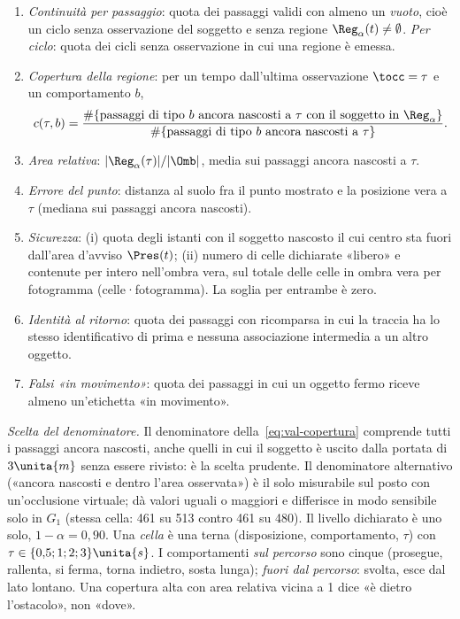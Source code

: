 \begin{definizione}[Misure]\label{def:val-misure}
\begin{enumerate}[label=(\alph*),itemsep=0pt]
\item \emph{Continuità per passaggio}: quota dei passaggi validi con almeno un \emph{vuoto}, cioè un ciclo senza osservazione del soggetto e senza regione $\Reg_\alpha(t)\neq\emptyset$. \emph{Per ciclo}: quota dei cicli senza osservazione in cui una regione è emessa.
\item \emph{Copertura della regione}: per un tempo dall'ultima osservazione $\tocc=\tau$ e un comportamento $b$,
\begin{equation}\label{eq:val-copertura}
c(\tau,b)=\frac{\#\{\text{passaggi di tipo } b \text{ ancora nascosti a } \tau \text{ con il soggetto in } \Reg_\alpha\}}{\#\{\text{passaggi di tipo } b \text{ ancora nascosti a } \tau\}} .
\end{equation}
\item \emph{Area relativa}: $|\Reg_\alpha(\tau)|/|\Omb|$, media sui passaggi ancora nascosti a $\tau$.
\item \emph{Errore del punto}: distanza al suolo fra il punto mostrato e la posizione vera a $\tau$ (mediana sui passaggi ancora nascosti).
\item \emph{Sicurezza}: (i) quota degli istanti con il soggetto nascosto il cui centro sta fuori dall'area d'avviso $\Pres(t)$; (ii) numero di celle dichiarate «libero» e contenute per intero nell'ombra vera, sul totale delle celle in ombra vera per fotogramma (celle·fotogramma). La soglia per entrambe è zero.
\item \emph{Identità al ritorno}: quota dei passaggi con ricomparsa in cui la traccia ha lo stesso identificativo di prima e nessuna associazione intermedia a un altro oggetto.
\item \emph{Falsi «in movimento»}: quota dei passaggi in cui un oggetto fermo riceve almeno un'etichetta «in movimento».
\end{enumerate}
\end{definizione}

\emph{Scelta del denominatore.} Il denominatore della~\eqref{eq:val-copertura} comprende tutti i passaggi ancora nascosti, anche quelli in cui il soggetto è uscito dalla portata di $3\unita{m}$ senza essere rivisto: è la scelta prudente. Il denominatore alternativo («ancora nascosti e dentro l'area osservata») è il solo misurabile sul posto con un'occlusione virtuale; dà valori uguali o maggiori e differisce in modo sensibile solo in $G_1$ (stessa cella: 461 su 513 contro 461 su 480). Il livello dichiarato è uno solo, $1-\alpha=0{,}90$. Una \emph{cella} è una terna (disposizione, comportamento, $\tau$) con $\tau\in\{0{,}5;1;2;3\}\unita{s}$. I comportamenti \emph{sul percorso} sono cinque (prosegue, rallenta, si ferma, torna indietro, sosta lunga); \emph{fuori dal percorso}: svolta, esce dal lato lontano. Una copertura alta con area relativa vicina a 1 dice «è dietro l'ostacolo», non «dove».

